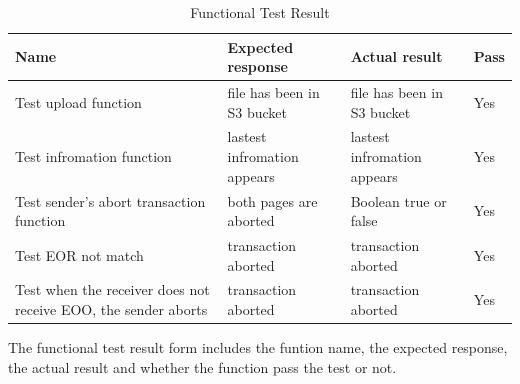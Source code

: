 \documentclass[runningheads]{llncs}
\begin{document}
	\begin{table}[H] %
    	\centering
    	\caption{Functional Test Result}
    	\label{table:Functional Test Result} 
    	\begin{threeparttable}
    		\begin{tabular} {p{3.2cm}|p{3.8cm}|p{3.8cm}|p{1.0cm}<{\centering}}    	
    		\toprule
      		Name & Expected response &  Actual result &  Pass  \\
      		\midrule
        	Test upload function & file has been in S3 bucket & file has been in S3 bucket & Yes \\
        	\hline
        	Test infromation function & lastest infromation appears  & lastest infromation appears & Yes \\
        	\hline
        	Test sender's abort transaction function & both pages are aborted & Boolean true or false & Yes \\
        	\hline
        	Test EOR not match  & transaction aborted & transaction aborted & Yes \\
        	\hline
        	Test when the receiver does not receive EOO, the sender aborts & transaction aborted & transaction aborted & Yes \\
      		\bottomrule
    		\end{tabular}
    		\begin{tablenotes}
          		\footnotesize
          		\item The functional test result form includes the funtion name, the expected response, the actual result and whether the function pass the test or not. 
        	\end{tablenotes}
    	\end{threeparttable}   
	\end{table}
	
\end{document}
